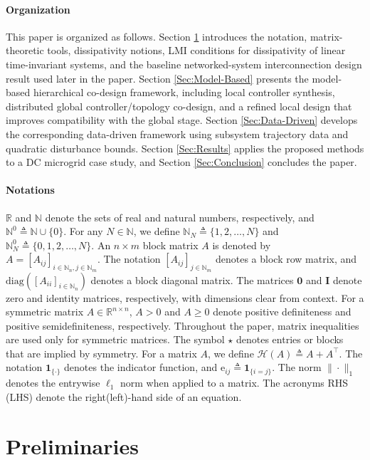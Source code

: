 \documentclass[letterpaper, 10 pt, conference]{ieeeconf}%
\newcommand{\T}{\top}
\newcommand{\I}{\mathbf{I}}
\newcommand{\0}{\mathbf{0}}
\newcommand{\e}{\mathrm{e}}
\newcommand{\diag}{\text{diag}}
\newcommand{\mb}[1]{\mathbf{#1}}
\begin{document}
\paragraph*{\textbf{Organization}} 
This paper is organized as follows. Section \ref{Preliminaries} introduces the notation, matrix-theoretic tools, dissipativity notions, LMI conditions for dissipativity of linear time-invariant systems, and the baseline networked-system interconnection design result used later in the paper. Section \ref{Sec:Model-Based} presents the model-based hierarchical co-design framework, including local controller synthesis, distributed global controller/topology co-design, and a refined local design that improves compatibility with the global stage. Section \ref{Sec:Data-Driven} develops the corresponding data-driven framework using subsystem trajectory data and quadratic disturbance bounds. Section \ref{Sec:Results} applies the proposed methods to a DC microgrid case study, and Section \ref{Sec:Conclusion} concludes the paper.

\paragraph*{\textbf{Notations}}
$\mathbb{R}$ and $\mathbb{N}$ denote the sets of real and natural numbers, respectively, and $\mathbb{N}^0 \triangleq \mathbb{N}\cup\{0\}$. 
For any $N\in\mathbb{N}$, we define $\mathbb{N}_N\triangleq\{1,2,\ldots,N\}$ and $\mathbb{N}_N^0\triangleq\{0,1,2,\ldots,N\}$. 
An $n\times m$ block matrix $A$ is denoted by $A=[A_{ij}]_{i\in\mathbb{N}_n,j\in\mathbb{N}_m}$. 
The notation $[A_{ij}]_{j\in\mathbb{N}_m}$ denotes a block row matrix, and $\diag([A_{ii}]_{i\in\mathbb{N}_n})$ denotes a block diagonal matrix. 
The matrices $\0$ and $\I$ denote zero and identity matrices, respectively, with dimensions clear from context. 
For a symmetric matrix $A\in\mathbb{R}^{n\times n}$, $A>0$ and $A\geq0$ denote positive definiteness and positive semidefiniteness, respectively. Throughout the paper, matrix inequalities are used only for symmetric matrices.
The symbol $\star$ denotes entries or blocks that are implied by symmetry. 
For a matrix $A$, we define $\mathcal{H}(A)\triangleq A+A^\T$. 
The notation $\mb{1}_{\{\cdot\}}$ denotes the indicator function, and $\e_{ij}\triangleq\mb{1}_{\{i=j\}}$. 
The norm $\|\cdot\|_1$ denotes the entrywise $\ell_1$ norm when applied to a matrix. 
The acronyms RHS (LHS) denote the right(left)-hand side of an equation.


\section{Preliminaries}\label{Preliminaries}
\end{document}
